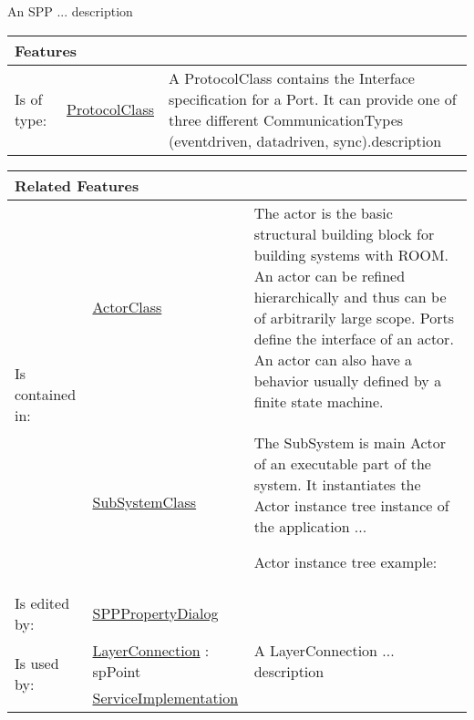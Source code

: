 			An SPP ... description
			
			
			\vspace{\baselineskip}
			\begingroup
			\renewcommand{\arraystretch}{1.8} %
			\parbox{\textwidth}{
			\begin{longtable}{l l p{}}
				\multicolumn{2}{l}{\textbf{\large Features}} & \\
				\hline
			Is of type: & \tabitem \hyperlink{ref:ProtocolClass}{ProtocolClass}  & A ProtocolClass contains the Interface specification for a Port. It can provide one of three different CommunicationTypes (eventdriven, datadriven, sync).description \\
			\hline
			\end{longtable}	
			}
			\endgroup
			\vspace{\baselineskip}
			
			\vspace{\baselineskip}
			\begingroup
			\renewcommand{\arraystretch}{1.8} %
			\parbox{\textwidth}{
			\begin{longtable}{l l p{}}
				\multicolumn{2}{l}{\textbf{\large Related Features}} & \\
				\hline
			\multirow{2}{*}{Is contained in:} & \tabitem \hyperlink{ref:ActorClass}{ActorClass}  & The actor is the basic structural building block for building systems with ROOM. An actor can be refined hierarchically and thus can be of arbitrarily large scope. Ports define the interface of an actor. An actor can also have a behavior usually defined by a finite state machine. \\
			& \tabitem \hyperlink{ref:SubSystemClass}{SubSystemClass}  & The SubSystem is main Actor of an executable part of the system. It instantiates the Actor instance tree instance of the application ...
				
				Actor instance tree example:
				 \\
			\hline
			Is edited by: & \tabitem \hyperlink{ref:SPPPropertyDialog}{SPPPropertyDialog}  & \\
			\hline
			\multirow{2}{*}{Is used by:} & \tabitem \hyperlink{ref:LayerConnection}{LayerConnection} : spPoint & A LayerConnection ... description \\
			& \tabitem \hyperlink{ref:ServiceImplementation}{ServiceImplementation}  &  \\
			\hline
			\end{longtable}	
			}
			\endgroup
			\vspace{\baselineskip}
			
